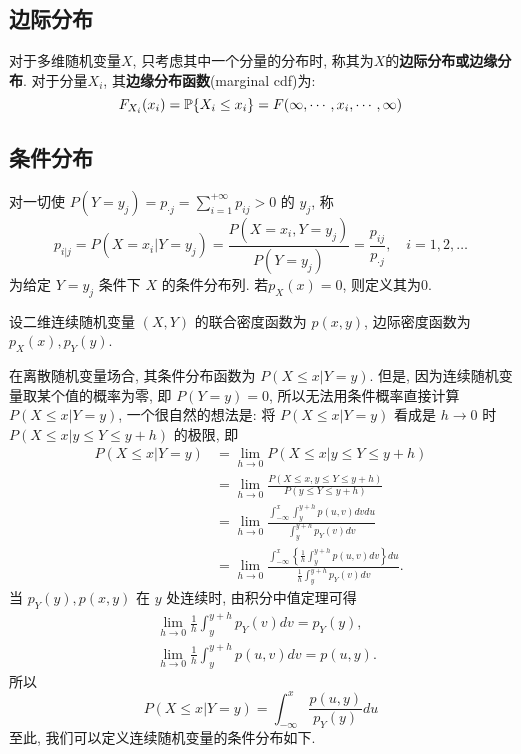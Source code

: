 \subsection{边际分布}

\begin{definition}
    对于多维随机变量$X$, 只考虑其中一个分量的分布时, 称其为$X$的\textbf{边际分布或边缘分布}. 对于分量$X_i$, 其\textbf{边缘分布函数}(marginal cdf)为:
    \[ F_{X_i}(x_i) = \P\{ X_i \le x_i \} = F(\infty,\cdots , x_i ,\cdots ,\infty)\]
\end{definition}

\subsection{条件分布}

\begin{definition}\label{def:cond_dist}
    对一切使 $P\left(Y=y_{j}\right)=p_{ \cdot j}=\sum_{i=1}^{+\infty} p_{i j}>0$ 的 $y_j$, 称
    \[ p_{i | j}=P\left(X=x_{i} | Y=y_{j}\right)=\frac{P\left(X=x_{i}, Y=y_{j}\right)}{P\left(Y=y_{j}\right)}
        =\frac{p_{i j}}{p_{\cdot j}}, \quad i=1,2, \ldots \]
    为给定 $Y=y_j$ 条件下 $X$ 的条件分布列. 若$p_X(x)=0$, 则定义其为0.
\end{definition}

设二维连续随机变量 $(X,Y)$ 的联合密度函数为 $p(x,y)$, 边际密度函数为 $p_X(x),p_Y(y)$.

在离散随机变量场合, 其条件分布函数为 $P(X\leq x|Y=y)$. 但是, 因为连续随机变量取某个值的概率为零, 即 $P(Y=y)=0$, 所以无法用条件概率直接计算 $P(X\leq x|Y=y)$, 一个很自然的想法是: 将 $P(X\leq x|Y=y)$ 看成是 $h\to 0$ 时 $P(X\leq x|y\leq Y\leq y+h)$ 的极限, 即
\begin{align*}
    P(X \leq  x | Y=y) & =\lim_{h \to 0} P(X \leq  x | y \leq  Y \leq  y+h)                                                  \\
                       & =\lim_{h \to 0} \frac{P(X \leq  x, y \leq  Y \leq  y+h)}{P(y \leq  Y \leq  y+h)}                    \\
                       & =\lim_{h \to 0} \frac{\int_{-\infty}^{x} \int_{y}^{y+h} p(u, v) dv du}{\int_{y}^{y+h} p_{Y}(v) dv}  \\
                       & =\lim_{h \to 0} \frac{\int_{-\infty}^{x} \left\{ \frac{1}{h} \int_{y}^{y+h} p(u, v) dv \right\} du}
    {\frac{1}{h} \int_{y}^{y+h} p_{Y}(v) dv}.
\end{align*}
当 $p_Y(y),p(x,y)$ 在 $y$ 处连续时, 由积分中值定理可得
\begin{align*}
     & \lim_{h \to 0} \frac{1}{h} \int_{y}^{y+h} p_{Y}(v) dv=p_{Y}(y), \\
     & \lim_{h \to 0} \frac{1}{h} \int_{y}^{y+h} p(u, v) dv=p(u, y).
\end{align*}
所以
\[ P(X \leq x | Y=y)=\int_{-\infty}^{x} \frac{p(u, y)}{p_{Y}(y)} du \]
至此, 我们可以定义连续随机变量的条件分布如下.

